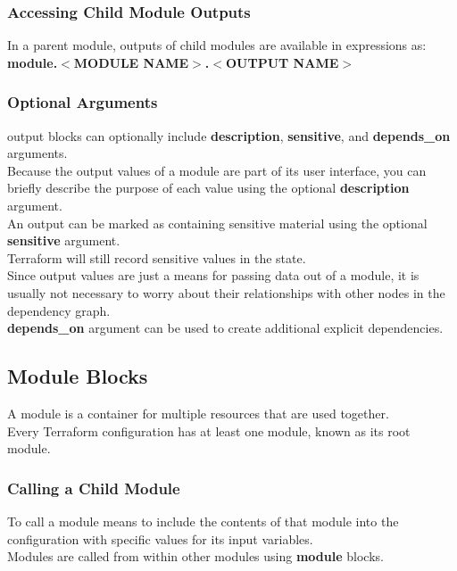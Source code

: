 \documentclass[12pt, letterpaper, twoside]{article}
\begin{document}
\subsubsection{Accessing Child Module Outputs}
In a parent module, outputs of child modules are available in expressions as:\\ 
\textbf{module.$<$MODULE NAME$>$.$<$OUTPUT NAME$>$}\\

\subsubsection{Optional Arguments}
output blocks can optionally include \textbf{description}, \textbf{sensitive}, and \textbf{depends\_on} arguments.\\

Because the output values of a module are part of its user interface, you can briefly describe the purpose 
of each value using the optional \textbf{description} argument.\\

An output can be marked as containing sensitive material using the optional \textbf{sensitive} argument.\\
Terraform will still record sensitive values in the state.\\

Since output values are just a means for passing data out of a module, it is usually not necessary to worry 
about their relationships with other nodes in the dependency graph.\\
\textbf{depends\_on} argument can be used to create additional explicit dependencies.\\

\subsection{Module Blocks}
A module is a container for multiple resources that are used together.\\

Every Terraform configuration has at least one module, known as its root module.\\

\subsubsection{Calling a Child Module}

To call a module means to include the contents of that module into the configuration with specific 
values for its input variables.\\ 
Modules are called from within other modules using \textbf{module} blocks.\\
\end{document}
